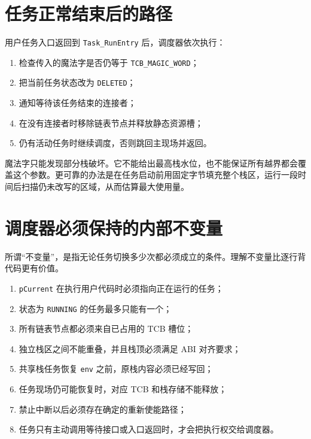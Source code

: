 \section{任务正常结束后的路径}

用户任务入口返回到 \texttt{Task\_RunEntry} 后，调度器依次执行：

\begin{enumerate}
\item 检查传入的魔法字是否仍等于 \texttt{TCB\_MAGIC\_WORD}；
\item 把当前任务状态改为 \texttt{DELETED}；
\item 通知等待该任务结束的连接者；
\item 在没有连接者时移除链表节点并释放静态资源槽；
\item 仍有活动任务时继续调度，否则跳回主现场并返回。
\end{enumerate}

魔法字只能发现部分栈破坏。它不能给出最高栈水位，也不能保证所有越界都会覆盖这个参数。更可靠的办法是在任务启动前用固定字节填充整个栈区，运行一段时间后扫描仍未改写的区域，从而估算最大使用量。

\section{调度器必须保持的内部不变量}

所谓“不变量”，是指无论任务切换多少次都必须成立的条件。理解不变量比逐行背代码更有价值。

\begin{enumerate}
\item \texttt{pCurrent} 在执行用户代码时必须指向正在运行的任务；
\item 状态为 \texttt{RUNNING} 的任务最多只能有一个；
\item 所有链表节点都必须来自已占用的 TCB 槽位；
\item 独立栈区之间不能重叠，并且栈顶必须满足 ABI 对齐要求；
\item 共享栈任务恢复 \texttt{env} 之前，原栈内容必须已经写回；
\item 任务现场仍可能恢复时，对应 TCB 和栈存储不能释放；
\item 禁止中断以后必须存在确定的重新使能路径；
\item 任务只有主动调用等待接口或入口返回时，才会把执行权交给调度器。
\end{enumerate}


